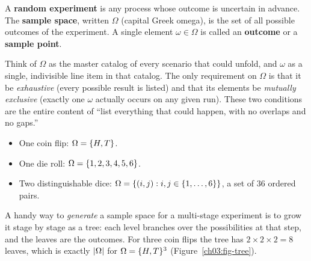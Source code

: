 \begin{definition}
\label{ch03:def-sample-space}
A \textbf{random experiment} is any process whose outcome is uncertain in
advance. The \textbf{sample space}, written $\Omega$ (capital Greek omega), is
the set of all possible outcomes of the experiment. A single element
$\omega \in \Omega$ is called an \textbf{outcome} or a \textbf{sample point}.
\end{definition}

Think of $\Omega$ as the master catalog of every scenario that could unfold, and
$\omega$ as a single, indivisible line item in that catalog. The only
requirement on $\Omega$ is that it be \emph{exhaustive} (every possible result is
listed) and that its elements be \emph{mutually exclusive} (exactly one $\omega$
actually occurs on any given run). These two conditions are the entire content of
``list everything that could happen, with no overlaps and no gaps.''

\begin{example}
\label{ch03:ex-three-spaces}
\begin{itemize}
\item One coin flip: $\Omega = \{H, T\}$.
\item One die roll: $\Omega = \{1,2,3,4,5,6\}$.
\item Two distinguishable dice: $\Omega = \{(i,j) : i,j \in \{1,\dots,6\}\}$,
a set of $36$ ordered pairs.
\end{itemize}
\end{example}

A handy way to \emph{generate} a sample space for a multi-stage experiment is to
grow it stage by stage as a tree: each level branches over the possibilities at
that step, and the leaves are the outcomes. For three coin flips the tree has
$2 \times 2 \times 2 = 8$ leaves, which is exactly $\lvert\Omega\rvert$ for
$\Omega = \{H,T\}^3$ (Figure~\ref{ch03:fig-tree}).

